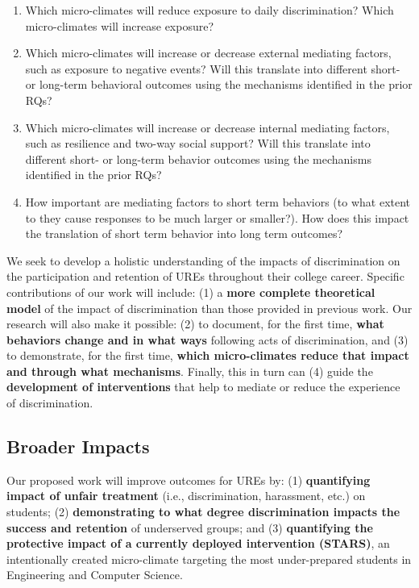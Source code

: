 \begin{enumerate}[start=7,label={\bfseries RQ\arabic*}, leftmargin=1cm]
    \item \label{itm:mc-daily-discrimination} Which micro-climates will reduce exposure to daily discrimination? Which micro-climates will increase exposure?

    \item \label{itm:mc-external-mediators} Which micro-climates will increase or decrease external mediating factors, such as exposure to negative events? Will this translate into different short- or long-term behavioral outcomes using the mechanisms identified in the prior RQs?
    \item \label{itm:mc-internal-mediators} Which micro-climates will increase or decrease internal mediating factors, such as resilience and two-way social support? Will this translate into different short- or long-term behavior outcomes using the mechanisms identified in the prior RQs?
    \item \label{itm:mc-mediators-behavior} How important are mediating factors to short term behaviors (to what extent to they cause responses to be much larger or smaller?). How does this impact the translation of short term behavior into long term outcomes?
\end{enumerate}
 
We seek to develop a holistic understanding of the impacts of discrimination on the participation and retention of UREs throughout  their college career. Specific contributions of our work will include: (1) a \textbf{more complete theoretical model} of the impact of discrimination than those provided in previous work.  Our research will also make it possible: (2) to document, for the first time, \textbf{what behaviors change and in what ways} following acts of discrimination, and (3) to demonstrate, for the first time, \textbf{which micro-climates reduce that impact and through what mechanisms}. Finally, this in turn can (4) guide the \textbf{development of interventions }that help to mediate or reduce the experience of discrimination.  

\subsection{Broader Impacts}
\noindent
Our proposed work will improve outcomes for UREs by: (1) \textbf{quantifying impact of unfair treatment} (i.e., discrimination, harassment, etc.)  on students; (2) \textbf{demonstrating to what degree discrimination impacts the success and retention} of underserved groups; and (3) \textbf{quantifying the protective impact of a currently deployed intervention (STARS)}, an intentionally created micro-climate targeting the most under-prepared  students in Engineering and Computer Science. 

